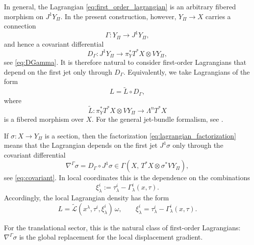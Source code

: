 \documentclass[11pt]{amsart}
\theoremstyle{plain}
\theoremstyle{definition}
\theoremstyle{remark}
\begin{document}
\medskip

In general, the Lagrangian \eqref{eq:first_order_lagrangian} is an arbitrary fibered morphism on \(J^1Y_\Pi\). 
In the present construction, however, \(Y_\Pi\to X\) carries a connection
\[
\Gamma:Y_\Pi\to J^1Y_\Pi,
\]
and hence a covariant differential
\[
D_\Gamma:J^1Y_\Pi\to \pi_Y^*T^*X\otimes VY_\Pi,
\]
see \eqref{eq:DGamma}. 
It is therefore natural to consider first-order Lagrangians that depend on the first jet only through \(D_\Gamma\). 
Equivalently, we take Lagrangians of the form
\begin{equation}
	L=\widetilde L\circ D_\Gamma,
	\label{eq:lagrangian_factorization}
\end{equation}
where
\begin{equation}
	\widetilde L:
	\pi_Y^*T^*X\otimes VY_\Pi \longrightarrow \Lambda^nT^*X
	\label{eq:Ltilde_map}
\end{equation}
is a fibered morphism over \(X\). 
For the general jet-bundle formalism, see \cite{SaundersJetBundles,GiachettaBook}.

If \(\sigma:X\to Y_\Pi\) is a section, then the factorization \eqref{eq:lagrangian_factorization} means that the Lagrangian depends on the first jet \(J^1\sigma\) only through the covariant differential
\[
\nabla^\Gamma\sigma
=
D_\Gamma\circ J^1\sigma
\in
\Gamma\!\left(X,\,T^*X\otimes \sigma^*VY_\Pi\right),
\]
see \eqref{eq:covariant}. 
In local coordinates this is the dependence on the combinations
\[
\xi^i_\lambda
:=
\tau^i_\lambda-\Gamma^i_\lambda(x,\tau).
\]
Accordingly, the local Lagrangian density has the form
\begin{equation}
	L=
	\widetilde{\mathcal L}(x^\lambda,\tau^i,\xi^i_\lambda)\,\omega,
	\qquad
	\xi^i_\lambda=\tau^i_\lambda-\Gamma^i_\lambda(x,\tau).
	\label{eq:factorized_lagrangian_density}
\end{equation}

For the translational sector, this is the natural class of first-order Lagrangians: \(\nabla^\Gamma\sigma\) is the global replacement for the local displacement gradient.

\medskip
\end{document}

